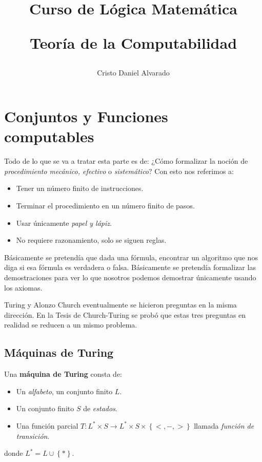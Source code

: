 \documentclass[12pt]{report}
\newcounter{it}
\theoremstyle{largebreak}
\newcommand\cf[3]{\ensuremath{#1:#2\rightarrow#3}}
\begin{document}
    \setlength{\parskip}{5pt} %
    \setlength{\parindent}{12pt} %
    \title{Curso de Lógica Matemática
    
    Teoría de la Computabilidad}
    \author{Cristo Daniel Alvarado}
    \maketitle

    \tableofcontents %

    \newpage

    \setcounter{chapter}{2}

    \chapter{Conjuntos y Funciones computables}

    Todo de lo que se va a tratar esta parte es de: ¿Cómo formalizar la noción de \textit{procedimiento mecánico, efectivo} o \textit{sistemático}? Con esto nos referimos a:
    \begin{itemize}
        \item Tener un número finito de instrucciones.
        \item Terminar el procedimiento en un número finito de pasos.
        \item Usar únicamente \textit{papel y lápiz}.
        \item No requiere razonamiento, solo se siguen reglas.
    \end{itemize}

    Básicamente se pretendía que dada una fórmula, encontrar un algoritmo que nos diga si esa fórmula es verdadera o falsa. Básicamente se pretendía formalizar las demostraciones para ver lo que nosotros podemos demostrar únicamente usando los axiomas.

    Turing y Alonzo Church eventualmente se hicieron preguntas en la misma dirección. En la Tesis de Church-Turing se probó que estas tres preguntas en realidad se reducen a un mismo problema.

    \section{Máquinas de Turing}

    \begin{mydef}
        Una \textbf{máquina de Turing} consta de:
        \begin{itemize}
            \item Un \textit{alfabeto}, un conjunto finito $L$.
            \item Un conjunto finito $S$ de \textit{estados}.
            \item Una función parcial $\cf{T}{L^*\times S}{L^*\times S\times\left\{<,-,> \right\}}$ llamada \textit{función de transición}.
        \end{itemize}
        donde $L^*=L\cup\left\{* \right\}$.
    \end{mydef}
\end{document}
